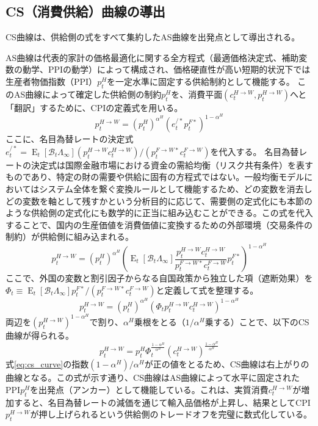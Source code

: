 
\subsection{CS（消費供給）曲線の導出}
\label{sec:chapter5_asad_cs}
CS曲線は、供給側の式をすべて集約したAS曲線を出発点として導出される。

AS曲線は代表的家計の価格最適化に関する全方程式（最適価格決定式、補助変数の動学、PPIの動学）によって構成され、価格硬直性が高い短期的状況下では生産者物価指数（PPI）\(p_t^H\)を一定水準に固定する供給制約として機能する。
このAS曲線によって確定した供給側の制約\(p_t^H\)を、消費平面\((c_t^{H\to W},p_t^{H\to W})\)へと「翻訳」するために、CPIの定義式を用いる。
\begin{equation}
\label{eq:cs_cpi_definition}
    p_t^{H\to W}=(p_t^H)^{\alpha^H}(e_t^{/*}p_t^{F*})^{1-\alpha^H}
\end{equation}
ここに、名目為替レートの決定式\(e_t^{/*}=\operatorname{E}_t[\mathcal{B}_t\Lambda_{\infty}](p_t^{H\to W}c_t^{H\to W})/(p_t^{F\to W*}c_t^{F\to W})\)を代入する。
名目為替レートの決定式は国際金融市場における資金の需給均衡（リスク共有条件）を表すものであり、特定の財の需要や供給に固有の方程式ではない。一般均衡モデルにおいてはシステム全体を繋ぐ変換ルールとして機能するため、どの変数を消去しどの変数を軸として残すかという分析目的に応じて、需要側の定式化にも本節のような供給側の定式化にも数学的に正当に組み込むことができる。この式を代入することで、国内の生産価値を消費価値に変換するための外部環境（交易条件の制約）が供給側に組み込まれる。
\begin{equation}
\label{eq:cs_cpi_substitution}
    p_t^{H\to W}=(p_t^H)^{\alpha^H}\left(\operatorname{E}_t[\mathcal{B}_t\Lambda_{\infty}]\frac{p_t^{H\to W}c_t^{H\to W}}{p_t^{F\to W*}c_t^{F\to W}}p_t^{F*}\right)^{1-\alpha^H}
\end{equation}
ここで、外国の変数と割引因子からなる自国政策から独立した項（遮断効果）を\(\Phi_t\equiv\operatorname{E}_t[\mathcal{B}_t\Lambda_{\infty}]p_t^{F*}/(p_t^{F\to W*}c_t^{F\to W})\)と定義して式を整理する。
\begin{equation}
\label{eq:cs_cpi_simplify}
    p_t^{H\to W}=(p_t^H)^{\alpha^H}\left(\Phi_tp_t^{H\to W}c_t^{H\to W}\right)^{1-\alpha^H}
\end{equation}
両辺を\((p_t^{H\to W})^{1-\alpha^H}\)で割り、\(\alpha^H\)乗根をとる（\(1/\alpha^H\)乗する）ことで、以下のCS曲線が得られる。
\begin{equation}
\label{eq:cs_curve}
    p_t^{H\to W}=p_t^H\Phi_t^{\frac{1-\alpha^H}{\alpha^H}}(c_t^{H\to W})^{\frac{1-\alpha^H}{\alpha^H}}
\end{equation}
式\eqref{eq:cs_curve}の指数\((1-\alpha^H)/\alpha^H\)が正の値をとるため、CS曲線は右上がりの曲線となる。この式が示す通り、CS曲線はAS曲線によって水平に固定されたPPI\(p_t^H\)を出発点（アンカー）として機能している。これは、実質消費\(c_t^{H\to W}\)が増加すると、名目為替レートの減価を通じて輸入品価格が上昇し、結果としてCPI\(p_t^{H\to W}\)が押し上げられるという供給側のトレードオフを完璧に数式化している。